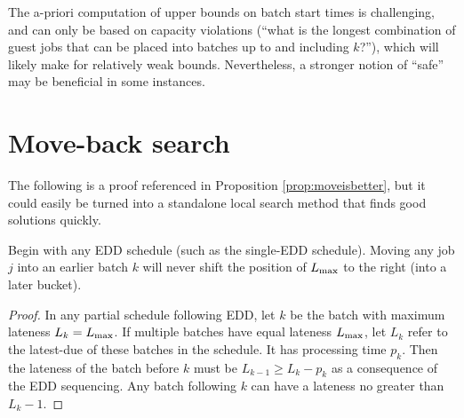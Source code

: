 \documentclass[13pt, letterpaper, oneside]{book}
\begin{document}
The a-priori computation of upper bounds on batch start times is challenging,
and can only be based on capacity violations (``what is the longest combination of
guest jobs that can be placed into batches up to and including $k$?''), which
will likely make for relatively weak bounds. Nevertheless, a stronger notion of
``safe'' may be beneficial in some instances.

\section{Move-back search}
The following is a proof referenced in Proposition \ref{prop:moveisbetter}, but
it could easily be turned into a standalone local search method that finds good
solutions quickly.

\begin{proposition}
Begin with any EDD schedule (such as the single-EDD schedule). Moving any job
$j$ into an earlier batch $k$ will never shift the position of $L_{\text{max}}$ to the
right (into a later bucket).

\begin{proof}
In any partial schedule following EDD, let $k$ be the batch
with maximum lateness $L_k = L_{\text{max}}$. If multiple batches have equal lateness
$L_{\text{max}}$, let $L_k$ refer to the latest-due of these batches in the schedule. It has processing time $p_k$. Then the lateness of the
batch before $k$ must be $L_{k-1} \geq L_k - p_k$ as a consequence of the EDD
sequencing. Any batch following $k$ can have a lateness no greater than $L_k -
1$.


\end{proof}
\end{proposition}
\end{document}
